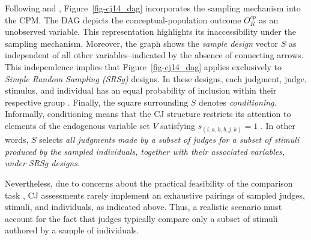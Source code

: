 \documentclass[
  authoryear,
  review,
  1p]{elsarticle}
\begin{document}
Following \citet{Bareinboim_et_al_2014} and
\citet{Schuessler_et_al_2023}, Figure~\ref{fig-cj14_dag} incorporates
the sampling mechanism into the CPM. The DAG depicts the
conceptual-population outcome \(O^{cp}_{R}\) as an unobserved variable.
This representation highlights its inaccessibility under the sampling
mechanism. Moreover, the graph shows the \emph{sample design} vector
\(S\) as independent of all other variables--indicated by the absence of
connecting arrows. This independence implies that
Figure~\ref{fig-cj14_dag} applies exclusively to \emph{Simple Random
Sampling (SRSg)} designs. In these designs, each judgment, judge,
stimulus, and individual has an equal probability of inclusion within
their respective group \citep{Lawson_2015}. Finally, the square
surrounding \(S\) denotes \emph{conditioning}. Informally, conditioning
means that the CJ structure restricts its attention to elements of the
endogenous variable set \(V\) satisfying \(s_{(i,a,h,b,j,k)} = 1\)
\citep{Neal_2020, McElreath_2020}. In other words, \(S\) selects
\emph{all judgments made by a subset of judges for a subset of stimuli
produced by the sampled individuals, together with their associated
variables, under SRSg designs}.

Nevertheless, due to concerns about the practical feasibility of the
comparison task \citep{Boonen_et_al_2020}, CJ assessments rarely
implement an exhaustive pairings of sampled judges, stimuli, and
individuals, as indicated above. Thus, a realistic scenario must account
for the fact that judges typically compare only a subset of stimuli
authored by a sample of individuals.
\end{document}

